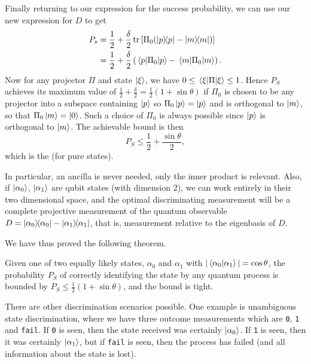 \documentclass[a4paper]{article}
\begin{document}
Finally returning to our expression for the success probability,
we can use our new expression for $D$ to get
\begin{align*}
	P_s &= \frac{1}{2} + \frac{\delta}{2}\tr\left[\Pi_0 (\dyad{p} - \dyad{m})\right] \\
	&= \frac{1}{2} + \frac{\delta}{2}\left(\ev{\Pi_0}{p} - \ev{\Pi_0}{m}\right).
\end{align*}
Now for any projector $\Pi$ and state $\ket{\xi}$, we have $0 \leq \ev{\Pi}{\xi} \leq 1$. Hence $P_S$ achieves its maximum value of $\frac{1}{2} + \frac{\delta}{2} = \frac{1}{2}(1 + \sin \theta)$ if $\Pi_0$ is chosen to be any projector into a subspace containing $\ket{p}$ so $\Pi_0\ket{p} = \ket{p}$ and is orthogonal to $\ket{m}$, so that $\Pi_0 \ket{m} = \ket{0}$. Such a choice of $\Pi_0$ is always possible since $\ket{p}$ is orthogonal to $\ket{m}$. The achievable bound is then
$$
P_S \leq \frac{1}{2} + \frac{\sin \theta}{2},
$$
which is the  (for pure states). 

In particular, an ancilla is never needed, only the inner product is relevant. Also, if $\ket{\alpha_0}$, $\ket{\alpha_1}$ are qubit states (with dimension 2), we can work entirely in their two dimensional space, and the optimal discriminating measurement will be a complete projective measurement of the quantum observable $D = \dyad{\alpha_0} - \dyad{\alpha_1}$, that is, measurement relative to the eigenbasis of $D$. 

We have thus proved the following theorem.

\begin{theorem}
	Given one of two equally likely states, $\alpha_0$ and $\alpha_1$ with $|\ip{\alpha_0}{\alpha_1}| = \cos \theta$, the probability $P_S$ of correctly identifying the state by any quantum process is bounded by $P_S \leq \frac{1}{2}(1 + \sin \theta)$, and the bound is tight.
\end{theorem}

\begin{remark}
	There are other discrimination scenarios possible. One example is unambiguous state discrimination, where we have three outcome measurements which are \texttt{0}, \texttt{1} and \texttt{fail}. If \texttt{0} is seen, then the state received was certainly $\ket{\alpha_0}$. If \texttt{1} is seen, then it was certainly $\ket{\alpha_1}$, but if \texttt{fail} is seen, then the process has failed (and all information about the state is lost).
\end{remark}
\end{document}
